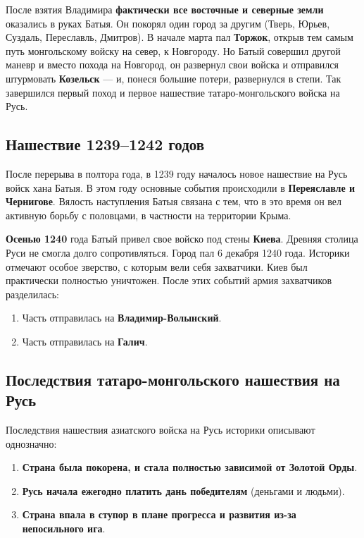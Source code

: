 \documentclass{article}
\begin{document}
После взятия Владимира \textbf{фактически все восточные и северные земли} оказались в руках Батыя. Он покорял один город за другим (Тверь, Юрьев, Суздаль, Переславль, Дмитров). В начале марта пал \textbf{Торжок}, открыв тем самым путь монгольскому войску на север, к Новгороду. Но Батый совершил другой маневр и вместо похода на Новгород, он развернул свои войска и отправился штурмовать \textbf{Козельск} — и, понеся большие потери, развернулся в степи. Так завершился первый поход и первое нашествие татаро-монгольского войска на Русь.

\subsection{Нашествие 1239–1242 годов}

После перерыва в полтора года, в 1239 году началось новое нашествие на Русь войск хана Батыя. В этом году основные события происходили в \textbf{Переяславле и Чернигове}. Вялость наступления Батыя связана с тем, что в это время он вел активную борьбу с половцами, в частности на территории Крыма.

\hfill

\textbf{Осенью 1240} года Батый привел свое войско под стены \textbf{Киева}. Древняя столица Руси не смогла долго сопротивляться. Город пал 6 декабря 1240 года. Историки отмечают особое зверство, с которым вели себя захватчики. Киев был практически полностью уничтожен. После этих событий армия захватчиков разделилась:

\begin{enumerate}
    \item Часть отправилась на \textbf{Владимир-Волынский}.
    \item Часть отправилась на \textbf{Галич}.
\end{enumerate}

\subsection{Последствия татаро-монгольского нашествия на Русь}

Последствия нашествия азиатского войска на Русь историки описывают однозначно:

\begin{enumerate}
    \item \textbf{Страна была покорена, и стала полностью зависимой от Золотой Орды}.
    \item \textbf{Русь начала ежегодно платить дань победителям} (деньгами и людьми).
    \item \textbf{Страна впала в ступор в плане прогресса и развития из-за непосильного ига}.
\end{enumerate}
\end{document}
